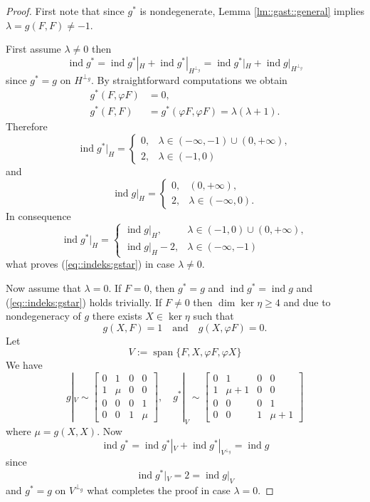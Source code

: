 \documentclass[12pt,a4paper,final]{amsart}
\numberwithin{equation}{section}
\theoremstyle{df}
\newcommand{\ind}{\operatorname{ind}}
\begin{document}
\begin{proof}
First note that since $g^\ast$ is nondegenerate, Lemma \ref{lm::gast::general} implies $\lambda=g(F,F)\neq -1$.

First assume $\lambda\neq 0$ then
$$
\ind g^\ast=\ind g^\ast|_H+\ind g^\ast|_{H^{\perp_g}} = \ind g^\ast|_H+\ind g|_{H^{\perp_g}}
$$
since $g^\ast=g$ on $H^{\perp_g}$.
By straightforward computations we obtain
\begin{align*}
g^\ast (F,\varphi F)&=0,\\
g^\ast(F,F)&=g^\ast (\varphi F,\varphi F)=\lambda (\lambda +1).
\end{align*}
Therefore
$$
\ind g^\ast|_H=
\begin{cases}
0,& \lambda\in(-\infty,-1)\cup(0,+\infty),\\
2,& \lambda\in(-1,0)
\end{cases}
$$
and
$$
\ind g|_H=
\begin{cases}
0,& (0,+\infty),\\
2,& \lambda\in(-\infty,0).
\end{cases}
$$
In consequence
$$
\ind g^\ast|_H=
\begin{cases}
\ind g|_H,& \lambda\in (-1,0)\cup(0,+\infty),\\
\ind g|_H-2,& \lambda\in(-\infty,-1)
\end{cases}
$$
what proves (\ref{eq::indeks:gstar}) in case $\lambda\neq 0$.
\par Now assume that $\lambda = 0$.  If $F=0$, then $g^\ast=g$ and $\ind g^\ast=\ind g$ and (\ref{eq::indeks:gstar}) holds trivially.
If $F\neq 0$ then $\dim\ker\eta\geq 4$ and due to nondegeneracy of $g$ there exists $X\in\ker\eta$ such that
$$
g(X,F)=1 \quad\text{and}\quad g(X,\varphi F)=0.
$$
Let
$$
V:= \operatorname{span}\{F,X,\varphi F,\varphi X \}
$$
We have
$$
g|_V\sim
\left[\begin{matrix}
  0 & 1 & 0 & 0 \\
  1 & \mu & 0 & 0 \\
  0 & 0 & 0 & 1 \\
  0 & 0 & 1 & \mu
\end{matrix}\right],\quad
g^\ast|_V\sim
\left[\begin{matrix}
  0 & 1 & 0 & 0 \\
  1 & \mu+1 & 0 & 0 \\
  0 & 0 & 0 & 1 \\
  0 & 0 & 1 & \mu+1
\end{matrix}\right]
$$
where $\mu = g(X,X)$.
Now
$$
\ind g^\ast = \ind g^\ast|_V+\ind g^\ast|_{V^{\perp_g}} = \ind g
$$
since
$$
\ind g^\ast|_V =2=  \ind g|_V
$$
and $g^\ast = g$ on $V^{\perp_g}$ what completes the proof in case $\lambda = 0$.
\end{proof}
\end{document}
